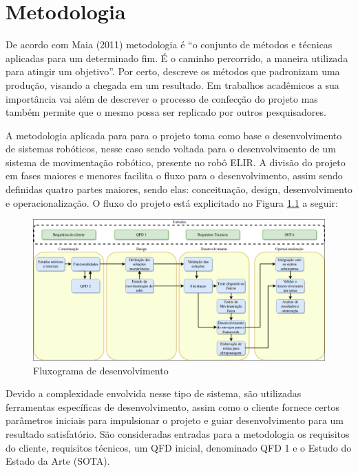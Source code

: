 \chapter{Metodologia}
\label{chap:meto}
De acordo com Maia (2011) metodologia é “o conjunto de métodos e técnicas aplicadas para um determinado fim. É o caminho percorrido, a maneira utilizada para atingir um objetivo”. Por certo, descreve os métodos que padronizam uma produção, visando a chegada em um resultado. Em trabalhos acadêmicos a sua importância vai além de descrever o processo de confecção do projeto mas também permite que o mesmo possa ser replicado por outros pesquisadores.

A metodologia aplicada para para o projeto toma como base o desenvolvimento de sistemas robóticos, nesse caso sendo voltada para o desenvolvimento de um sistema de movimentação robótico, presente no robô ELIR. A divisão do projeto em fases maiores e menores facilita o fluxo para o desenvolvimento, assim sendo definidas quatro partes maiores, sendo elas: conceituação, design, desenvolvimento e operacionalização. O fluxo do projeto está explicitado no Figura \ref{fig:flux_desen} a seguir: 


\begin{figure}[!htb]
	\centering
	\includegraphics[scale=0.45]{Figures/flux_desen.png}
	\caption{Fluxograma de desenvolvimento}
	\label{fig:flux_desen}
\end{figure}	

Devido a complexidade envolvida nesse tipo de sistema, são utilizadas ferramentas específicas de desenvolvimento, assim como o cliente fornece certos parâmetros iniciais para impulsionar o projeto e guiar desenvolvimento para um resultado satisfatório. São consideradas entradas para a metodologia os requisitos do cliente, requisitos técnicos, um QFD inicial, denominado QFD 1 e o Estudo do Estado da Arte (SOTA).


